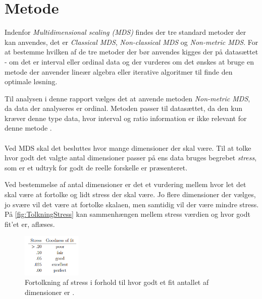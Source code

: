 \section*{Metode}
\label{Metode}
%
Indenfor \textit{Multidimensional scaling (MDS)} findes der tre standard metoder der kan anvendes, det er \textit{Classical MDS}, \textit{Non-classical MDS} og \textit{Non-metric MDS}. For at bestemme hvilken af de tre metoder der bør anvendes kigges der på datasættet - om det er interval eller ordinal data og der vurderes om det ønskes at bruge en metode der anvender lineær algebra eller iterative algoritmer til finde den optimale løsning. 

Til analysen i denne rapport vælges det at anvende metoden \textit{Non-metric MDS}, da data der analyseres er ordinal. Metoden passer til datasættet, da den kun kræver denne type data, hvor interval og ratio information er ikke relevant for denne metode \parencite[p.9]{Wickelmaier2003}. 
\\\\
Ved MDS skal det besluttes hvor mange dimensioner der skal være. Til at tolke hvor godt det valgte antal dimensioner passer på ens data bruges begrebet \textit{stress}, som er et udtryk for godt de reelle forskelle er præsenteret. 

Ved bestemmelse af antal dimensioner er det et vurdering mellem hvor let det skal være at fortolke og lidt stress der skal være. Jo flere dimensioner der vælges, jo svære vil det være at fortolke skalaen, men samtidig vil der være mindre stress. På \autoref{fig:TolkningStress} kan sammenhængen mellem stress værdien og hvor godt fit'et er, aflæses. 

\begin{figure}[H]
\centering
\includegraphics[width = 0.25\textwidth]{Figure/TolkningStress.PNG} 
\caption{Fortolkning af stress i forhold til hvor godt et fit antallet af dimensioner er \parencite[p.13]{Wickelmaier2003}. }
\label{fig:TolkningStress}
\end{figure}
